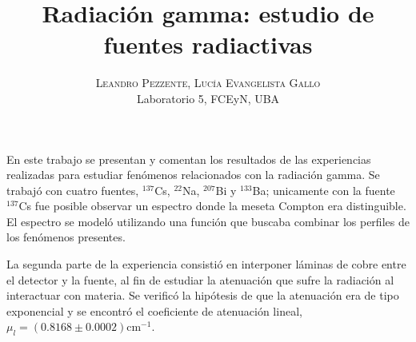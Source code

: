 \documentclass[twoside]{article}
\title{\vspace{-15mm}\fontsize{24pt}{10pt}\selectfont\textbf{Radiación gamma: estudio de fuentes radiactivas}} %
\author{
\large
\textsc{Leandro Pezzente, Lucía Evangelista Gallo}\\[2mm] %
\normalsize Laboratorio 5, FCEyN, UBA \\ %
\vspace{-5mm}
}
\date{}
\begin{document}
\maketitle %

\thispagestyle{fancy} %


\begin{abstract*}
En este trabajo se presentan y comentan los resultados de las experiencias realizadas para estudiar fenómenos relacionados con la radiación gamma. Se trabajó con cuatro fuentes, $^{137}$Cs, $^{22}$Na, $^{207}$Bi y $^{133}$Ba; unicamente con la fuente $^{137}$Cs fue posible observar un espectro donde la meseta Compton era distinguible. El espectro se modeló utilizando una función que buscaba combinar los perfiles de los fenómenos presentes. 

La segunda parte de la experiencia consistió en interponer láminas de cobre entre el detector y la fuente, al fin de estudiar la atenuación que sufre la radiación al interactuar con materia. Se verificó la hipótesis de que la atenuación era de tipo exponencial y se encontró el coeficiente de atenuación lineal, $\mu_l = (0.8168 \pm 0.0002)$cm$^{-1}$.

\end{abstract*}

\end{document}
